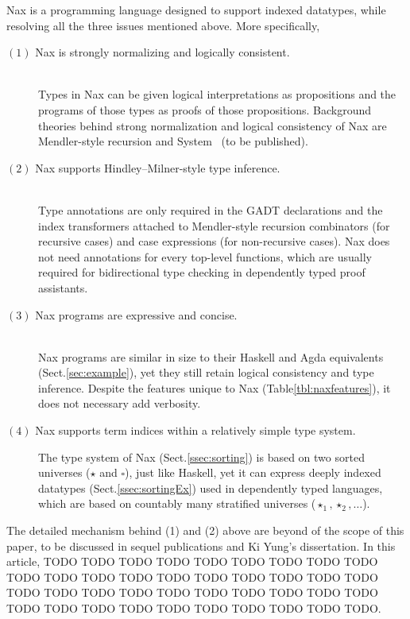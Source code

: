 Nax is a programming language designed to support indexed datatypes,
while resolving all the three issues mentioned above.
More specifically,
\begin{description}
\item[$(1)$ Nax is strongly normalizing and logically consistent.]~\\
Types in Nax can be given logical interpretations as propositions
and the programs of those types as proofs of those propositions.
Background theories behind strong normalization and logical consistency of Nax
are Mendler-style recursion \cite{AhnShe11} and System \Fi\ (to be published).

\item[$(2)$ Nax supports Hindley--Milner-style type inference.]~\\
Type annotations are only required in the GADT declarations and
the index transformers attached to Mendler-style recursion combinators
(for recursive cases) and case expressions (for non-recursive cases).
Nax does not need annotations for every top-level functions, which are usually
required for bidirectional type checking in dependently typed proof assistants.

\item[$(3)$ Nax programs are expressive and concise.]~\\
Nax programs are similar in size to their Haskell and Agda equivalents
(Sect.\;\ref{sec:example}), yet they still retain logical consistency
and type inference. Despite the features unique to Nax
(Table\;\ref{tbl:naxfeatures}), it does not necessary add verbosity.

\item[$(4)$ Nax supports term indices within a relatively simple type system.]
The type system of Nax (Sect.\;\ref{ssec:sorting}) is based on
two sorted universes ($\star$ and $\square$), just like Haskell,
yet it can express deeply indexed datatypes (Sect.\;\ref{ssec:sortingEx})
used in dependently typed languages, which are based on countably many
stratified universes ($\star_1,\star_2,\dots$).
\end{description}
The detailed mechanism behind (1) and (2) above are beyond of the scope of
this paper, to be discussed in sequel publications and Ki Yung's dissertation.
In this article, TODO TODO TODO 
TODO TODO TODO TODO TODO TODO TODO TODO TODO TODO TODO TODO
TODO TODO TODO TODO TODO TODO TODO TODO TODO TODO TODO TODO
TODO TODO TODO TODO TODO TODO TODO TODO TODO TODO TODO TODO.
